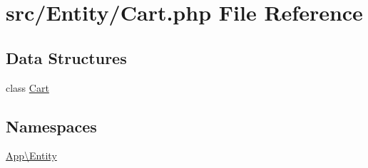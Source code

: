 \hypertarget{_cart_8php}{}\section{src/\+Entity/\+Cart.php File Reference}
\label{_cart_8php}
\subsection*{Data Structures}
\begin{DoxyCompactItemize}
\item 
class \mbox{\hyperlink{class_app_1_1_entity_1_1_cart}{Cart}}
\end{DoxyCompactItemize}
\subsection*{Namespaces}
\begin{DoxyCompactItemize}
\item 
 \mbox{\hyperlink{namespace_app_1_1_entity}{App\textbackslash{}\+Entity}}
\end{DoxyCompactItemize}
